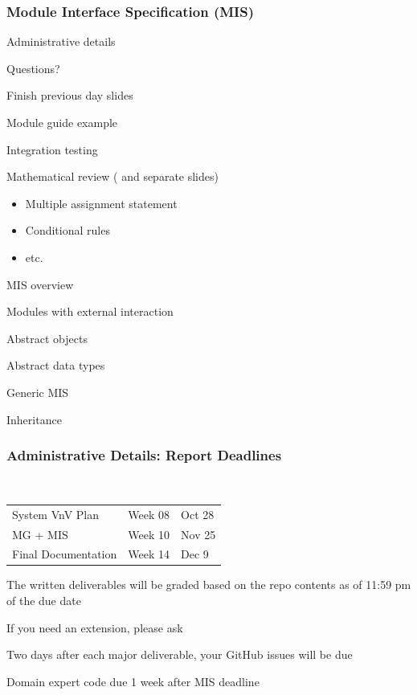 \documentclass[t, 12pt, numbers, fleqn, handout]{beamer}
\begin{document}



\begin{frame}
\frametitle{Module Interface Specification (MIS)}

\bi
\item Administrative details
\item Questions?
\item Finish previous day slides
\item Module guide example
\item Integration testing
\item Mathematical review (\cite{HoffmanAndStrooper1995} and separate slides)
\begin{itemize}
\item Multiple assignment statement
\item Conditional rules
\item etc.
\end{itemize}
\item MIS overview
\item Modules with external interaction
\item Abstract objects
\item Abstract data types
\item Generic MIS
\item Inheritance
\ei
\end{frame}


\begin{frame}
\frametitle{Administrative Details: Report Deadlines}
~\newline
\begin{tabular}{l l l}
System VnV Plan & Week 08 & Oct 28\\
MG + MIS & Week 10 & Nov 25\\
Final Documentation & Week 14 & Dec 9\\
\end {tabular}

\bi
\item The written deliverables will be graded based on the repo contents as of
11:59 pm of the due date
\item If you need an extension, please ask
\item Two days after each major deliverable, your GitHub issues will be due
\item Domain expert code due 1 week after MIS deadline
\ei

\end{frame}
\end{document}

